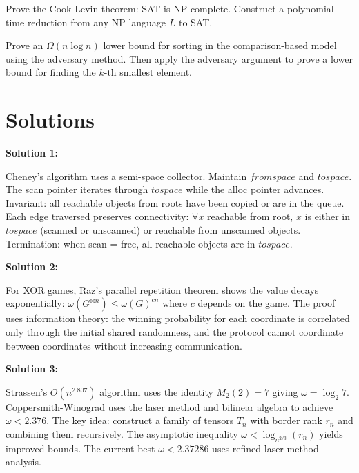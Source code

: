 \documentclass[12pt,a4paper]{exam}
\begin{document}
\begin{questions}
\vspace{0.3cm}

\question[3]
Prove the Cook-Levin theorem: SAT is NP-complete. Construct a polynomial-time reduction from any NP language $L$ to SAT.

\vspace{0.3cm}

\question[5]
Prove an $\Omega(n \log n)$ lower bound for sorting in the comparison-based model using the adversary method. Then apply the adversary argument to prove a lower bound for finding the $k$-th smallest element.

\vspace{0.3cm}

\end{questions}

\newpage
\section*{Solutions}

\textbf{Solution 1:}

Cheney's algorithm uses a semi-space collector. Maintain $fromspace$ and $tospace$. The scan pointer iterates through $tospace$ while the alloc pointer advances. Invariant: all reachable objects from roots have been copied or are in the queue. Each edge traversed preserves connectivity: $\forall x$ reachable from root, $x$ is either in $tospace$ (scanned or unscanned) or reachable from unscanned objects. Termination: when scan = free, all reachable objects are in $tospace$.

\vspace{0.5cm}

\textbf{Solution 2:}

For XOR games, Raz's parallel repetition theorem shows the value decays exponentially: $\omega(G^{\otimes n}) \leq \omega(G)^{c n}$ where $c$ depends on the game. The proof uses information theory: the winning probability for each coordinate is correlated only through the initial shared randomness, and the protocol cannot coordinate between coordinates without increasing communication.

\vspace{0.5cm}

\textbf{Solution 3:}

Strassen's $O(n^{2.807})$ algorithm uses the identity $M_2(2) = 7$ giving $\omega = \log_2 7$. Coppersmith-Winograd uses the laser method and bilinear algebra to achieve $\omega < 2.376$. The key idea: construct a family of tensors $T_n$ with border rank $r_n$ and combining them recursively. The asymptotic inequality $\omega < \log_{n^{2/3}}(r_n)$ yields improved bounds. The current best $\omega < 2.37286$ uses refined laser method analysis.
\end{document}
